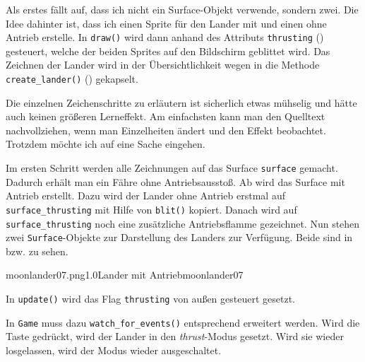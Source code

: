 Als erstes fällt auf, dass ich nicht ein Surface-Objekt verwende, sondern zwei. Die Idee dahinter ist, dass ich einen Sprite für den Lander mit und einen ohne Antrieb erstelle. In \texttt{draw()} wird dann anhand des Attributs \texttt{thrusting} () gesteuert, welche der beiden Sprites auf den Bildschirm geblittet wird. Das Zeichnen der Lander wird in der Übersichtlichkeit wegen in die Methode \texttt{create\_lander()} () gekapselt.


Die einzelnen Zeichenschritte zu erläutern ist sicherlich etwas mühselig und hätte auch keinen größeren Lerneffekt. Am einfachsten kann man den Quelltext nachvollziehen, wenn man Einzelheiten ändert und den Effekt beobachtet. Trotzdem möchte ich auf eine Sache eingehen. 

Im ersten Schritt werden alle Zeichnungen auf das Surface \texttt{surface} gemacht. Dadurch erhält man ein Fähre ohne Antriebsausstoß. Ab  wird das Surface mit Antrieb erstellt. Dazu wird der Lander ohne Antrieb erstmal auf \texttt{surface\_thrusting} mit Hilfe von \texttt{blit()} kopiert. Danach wird auf \texttt{surface\_thrusting} noch eine zusätzliche Antriebsflamme gezeichnet. Nun stehen zwei \texttt{Surface}-Objekte zur Darstellung des Landers zur Verfügung. Beide sind in  bzw.  zu sehen.


%
             {moonlander07.png}{1.0}{Lander mit Antrieb}{moonlander07}

In \texttt{update()} wird das Flag \texttt{thrusting} von außen gesteuert gesetzt. 


In \texttt{Game} muss dazu \texttt{watch\_for\_events()} entsprechend erweitert werden. Wird die Taste \keys{\SPACE} gedrückt, wird der Lander in den \emph{thrust}-Modus gesetzt. Wird sie wieder losgelassen, wird der Modus wieder ausgeschaltet.

